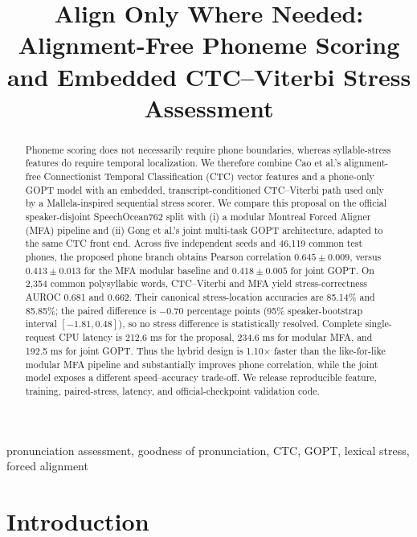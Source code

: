 \documentclass[10pt,conference]{IEEEtran}
\begin{document}
\title{Align Only Where Needed: Alignment-Free Phoneme Scoring and Embedded CTC--Viterbi Stress Assessment}

\author{
}

\maketitle

\begin{abstract}
Phoneme scoring does not necessarily require phone boundaries, whereas
syllable-stress features do require temporal localization. We therefore
combine Cao et al.'s alignment-free Connectionist Temporal Classification
(CTC) vector features and a phone-only GOPT model with an embedded,
transcript-conditioned CTC--Viterbi path used only by a Mallela-inspired
sequential stress scorer. We compare this proposal on the official
speaker-disjoint SpeechOcean762 split with (i) a modular Montreal Forced
Aligner (MFA) pipeline and (ii) Gong et al.'s joint multi-task GOPT
architecture, adapted to the same CTC front end. Across five independent
seeds and 46,119 common test phones, the proposed phone branch obtains Pearson
correlation $0.645\mathbin{\pm}0.009$, versus $0.413\mathbin{\pm}0.013$ for
the MFA modular baseline and $0.418\mathbin{\pm}0.005$ for joint GOPT. On
2,354 common polysyllabic words, CTC--Viterbi and MFA yield stress-correctness
AUROC 0.681 and 0.662. Their canonical stress-location accuracies are 85.14\%
and 85.85\%; the paired difference is $-0.70$ percentage points (95\%
speaker-bootstrap interval $[-1.81,0.48]$), so no stress difference is
statistically resolved. Complete single-request CPU latency is 212.6 ms for
the proposal, 234.6 ms for modular MFA, and 192.5 ms for joint GOPT. Thus the
hybrid design is 1.10$\times$ faster than the like-for-like modular MFA
pipeline and substantially improves phone correlation, while the joint model
exposes a different speed--accuracy trade-off. We release reproducible feature,
training, paired-stress, latency, and official-checkpoint validation code.
\end{abstract}

\begin{IEEEkeywords}
pronunciation assessment, goodness of pronunciation, CTC, GOPT, lexical
stress, forced alignment
\end{IEEEkeywords}

\section{Introduction}
\end{document}
